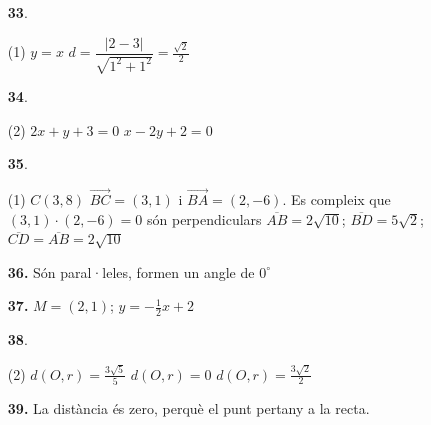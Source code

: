 \documentclass[a4paper, pdf, twoside]{book}
\begin{document}
\begin{multicols}{2}
\begin{enumerate}

 \item[\fontfamily{phv}\selectfont\color{blue}\textbf{33}. ] 
 \begin{tasks}[column-sep=1em, item-indent=1.3333em](1)
	 \task $y=x$
	 \task* $d=\dfrac {|2-3|}{\sqrt {1^2+1^2}}=\frac {\sqrt {2}}{2}$
\end{tasks}
\vspace{0.25cm}



 \item[\fontfamily{phv}\selectfont\color{blue}\textbf{34}. ] 
 \begin{tasks}[column-sep=1em, item-indent=1.3333em](2)
	 \task $2x+y+3=0$
	 \task $x-2y+2=0$
\end{tasks}
\vspace{0.25cm}



 \item[\fontfamily{phv}\selectfont\color{blue}\textbf{35}. ] 
 \begin{tasks}[column-sep=1em, item-indent=1.3333em](1)
	 \task $C(3,8)$
	 \task* $\overrightarrow {BC}=(3,1)$ i $\overrightarrow {BA}=(2,-6)$. Es compleix que $(3,1)\cdot (2,-6)=0$ són perpendiculars
	 \task* $\overline {AB}=2\sqrt {10}$; $\overline {BD}=5\sqrt {2}$; $\overline {CD}=\overline {AB}=2\sqrt {10}$
\end{tasks}
\vspace{0.25cm}
\item[\fontfamily{phv}\selectfont\color{blue}\textbf{36. }] 
Són paral·leles, formen un angle de $0^\circ $
\vspace{0.25cm}
\item[\fontfamily{phv}\selectfont\color{blue}\textbf{37. }] 
$M=(2,1)$; $y=-\frac {1}{2}x+2$
\vspace{0.25cm}



 \item[\fontfamily{phv}\selectfont\color{blue}\textbf{38}. ] 
 \begin{tasks}[column-sep=1em, item-indent=1.3333em](2)
	 \task $d(O,r)=\frac {3\sqrt {5}}{5}$
	 \task $d(O,r)=0$
	 \task $d(O,r)=\frac {3\sqrt {2}}{2}$
\end{tasks}
\vspace{0.25cm}
\item[\fontfamily{phv}\selectfont\color{blue}\textbf{39. }] 
La distància és zero, perquè el punt pertany a la recta.
\vspace{0.25cm}



\end{enumerate}
\end{multicols}
\end{document}
